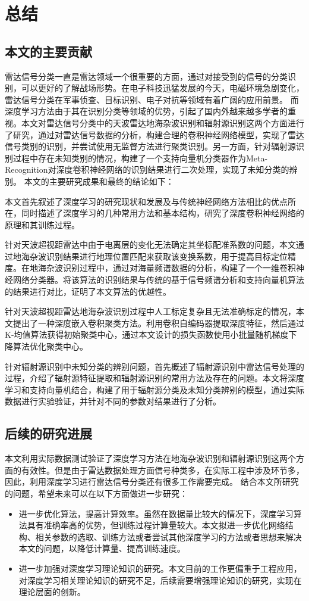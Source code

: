 
\chapter{总结}
\label{sec:paper_summary}
\section{本文的主要贡献}
雷达信号分类一直是雷达领域一个很重要的方面，通过对接受到的信号的分类识别，可以更好的了解战场形势。在电子科技迅猛发展的今天，电磁环境急剧变化，雷达信号分类在军事侦查、目标识别、电子对抗等领域有着广阔的应用前景。
而深度学习方法由于其在识别分类等领域的优势，引起了国内外越来越多学者的重视。本文对雷达信号分类中的天波雷达地海杂波识别和辐射源识别这两个方面进行了研究，通过对雷达信号数据的分析，构建合理的卷积神经网络模型，实现了雷达信号类别的识别，并尝试使用无监督方法进行聚类识别。另一方面，针对辐射源识别过程中存在未知类别的情况，构建了一个支持向量机分类器作为Meta-Recognition对深度卷积神经网络的识别结果进行二次处理，实现了未知分类的辨别。
本文的主要研究成果和最终的结论如下：

本文首先叙述了深度学习的研究现状和发展及与传统神经网络方法相比的优点所在，同时描述了深度学习的几种常用方法和基本结构，研究了深度卷积神经网络的原理和其训练过程。

针对天波超视距雷达中由于电离层的变化无法确定其坐标配准系数的问题，本文通过地海杂波识别结果进行地理位置匹配来获取该变换系数，用于提高目标定位精度。在地海杂波识别过程中，通过对海量频谱数据的分析，构建了一个一维卷积神经网络分类器。将该算法的识别结果与传统的基于信号频谱分析和支持向量机算法的结果进行对比，证明了本文算法的优越性。

针对天波超视距雷达地海杂波识别过程中人工标定复杂且无法准确标定的情况，本文提出了一种深度嵌入卷积聚类方法。利用卷积自编码器提取深度特征，然后通过K-均值算法获得初始聚类中心，通过本文设计的损失函数使用小批量随机梯度下降算法优化聚类中心。

针对辐射源识别中未知分类的辨别问题，首先概述了辐射源识别中雷达信号处理的过程，介绍了辐射源特征提取和辐射源识别的常用方法及存在的问题。本文将深度学习和支持向量机结合，构建了用于辐射源分类及未知分类辨别的模型，通过实际数据进行实验验证，并针对不同的参数对结果进行了分析。
\section{后续的研究进展}
本文利用实际数据测试验证了深度学习方法在地海杂波识别和辐射源识别这两个方面的有效性。但是由于雷达数据处理方面信号种类多，在实际工程中涉及环节多，因此，利用深度学习进行雷达信号分类还有很多工作需要完成。
结合本文所研究的问题，希望未来可以在以下方面做进一步研究：
\begin{itemize}
	\item 进一步优化算法，提高计算效率。虽然在数据量比较大的情况下，深度学习算法具有准确率高的优势，但训练过程计算量较大。本文拟进一步优化网络结构、相关参数的选取、训练方法或者尝试其他深度学习的方法或者思想来解决本文的问题，以降低计算量、提高训练速度。
	\item 进一步加强对深度学习理论知识的研究。本文目前的工作更偏重于工程应用，对深度学习相关理论知识的研究不足，后续需要增强理论知识的研究，实现在理论层面的创新。
\end{itemize}
